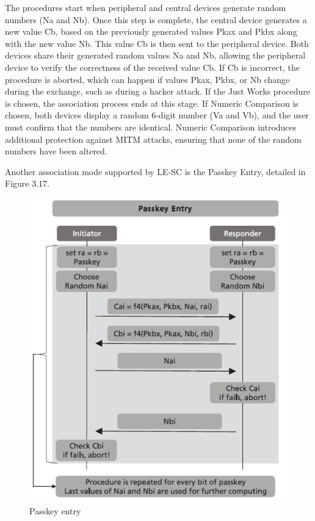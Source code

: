 \documentclass{Configuration_Files/PoliMi3i_thesis}
\begin{document}
The procedures start when peripheral and central devices generate random numbers (Na and Nb). Once this step is complete, the central device generates a new value Cb, based on the previously generated values Pkax and Pkbx along with the new value Nb. This value Cb is then sent to the peripheral device. Both devices share their generated random values Na and Nb, allowing the peripheral device to verify the correctness of the received value Cb. If Cb is incorrect, the procedure is aborted, which can happen if values Pkax, Pkbx, or Nb change during the exchange, such as during a hacker attack. If the Just Works procedure is chosen, the association process ends at this stage. If Numeric Comparison is chosen, both devices display a random 6-digit number (Va and Vb), and the user must confirm that the numbers are identical. Numeric Comparison introduces additional protection against MITM attacks, ensuring that none of the random numbers have been altered.

Another association mode supported by LE-SC is the Passkey Entry, detailed in Figure 3.17.

\begin{figure}[H]
    \centering
    \includegraphics[scale=0.7]{Bluetooth_Security/7.png}
    \caption{Passkey entry \cite{casarSurveyBluetoothLow2022}}
    \label{bluetooth_sec_7}
\end{figure}
\end{document}
